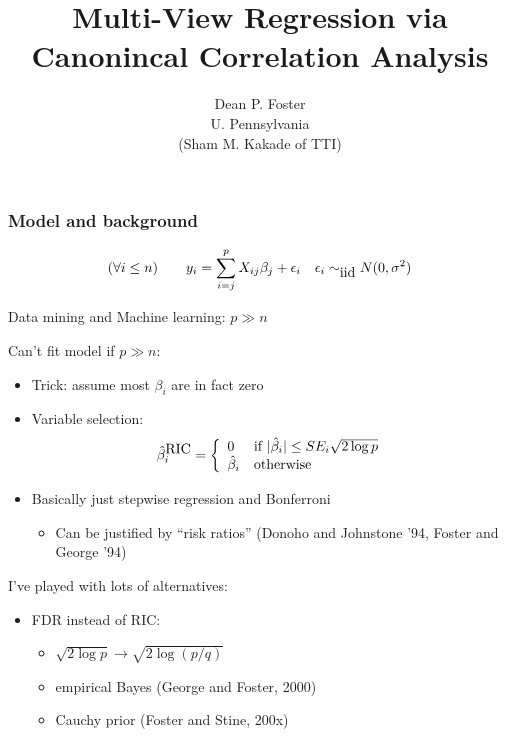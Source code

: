 \documentclass{beamer}
\title{Multi-View Regression via Canonincal Correlation Analysis}
\author{Dean P. Foster \\ 
U. Pennsylvania\\ $\quad$ \\ (Sham M. Kakade of TTI) }
\date{}
\begin{document}

  \titlepage


\begin{frame}
\frametitle{Model and background}

\begin{displaymath}
(\forall i \le n) \quad\quad y_i = \sum_{i=j}^p X_{ij} \beta_j +
\epsilon_i \quad \epsilon_i \sim_{\hbox{iid}} N(0,\sigma^2) 
\end{displaymath}
\begin{overprint}

Data mining and Machine learning: $p \gg n$


Can't fit model if $p \gg n$:

  \begin{itemize}
\item Trick: assume most $\beta_i$ are in fact zero
\item Variable selection:
\begin{displaymath}
\hat{\beta}_i^{\hbox{RIC}} =
 \left\{\begin{array}{ll}
            0 & \hbox{if } |\hat{\beta}_i| \le SE_i \sqrt{2 \log p} \\
            \hat{\beta}_i & \hbox{otherwise}
        \end{array}
  \right.
\end{displaymath}
\item Basically just stepwise regression and Bonferroni
\begin{itemize}
\item Can be justified by ``risk ratios'' (Donoho and Johnstone '94, Foster and George '94)
\end{itemize}
\end{itemize}



I've played with lots of alternatives:
\begin{itemize}
\item FDR instead of RIC:
\begin{itemize}
\item $\sqrt{2 \log p} \to \sqrt{2 \log (p/q)}$
\item empirical Bayes (George and Foster, 2000)
\item Cauchy prior (Foster and Stine, 200x)


\end{itemize}
\end{itemize}
\end{overprint}
\end{frame}
\end{document}
